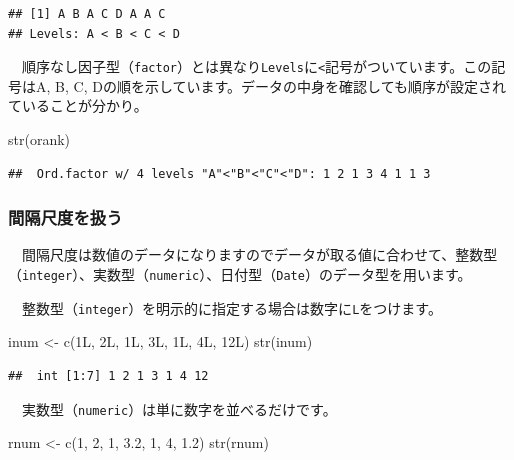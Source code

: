 \documentclass[
  12pt,
]{book}
\newenvironment{Shaded}{\begin{snugshade}}{\end{snugshade}}
\newcommand{\DecValTok}[1]{\textcolor[rgb]{0.00,0.00,0.81}{#1}}
\newcommand{\FloatTok}[1]{\textcolor[rgb]{0.00,0.00,0.81}{#1}}
\newcommand{\FunctionTok}[1]{\textcolor[rgb]{0.00,0.00,0.00}{#1}}
\newcommand{\NormalTok}[1]{#1}
\newcommand{\OtherTok}[1]{\textcolor[rgb]{0.56,0.35,0.01}{#1}}
\begin{document}
\begin{verbatim}
## [1] A B A C D A A C
## Levels: A < B < C < D
\end{verbatim}

　順序なし因子型（\texttt{factor}）とは異なり\texttt{Levels}に\texttt{\textless{}}記号がついています。この記号はA, B, C, Dの順を示しています。データの中身を確認しても順序が設定されていることが分かり。

\begin{Shaded}
\begin{Highlighting}[numbers=left,,]
\FunctionTok{str}\NormalTok{(orank)}
\end{Highlighting}
\end{Shaded}

\begin{verbatim}
##  Ord.factor w/ 4 levels "A"<"B"<"C"<"D": 1 2 1 3 4 1 1 3
\end{verbatim}

\hypertarget{ux9593ux9694ux5c3aux5ea6ux3092ux6271ux3046}{%
\subsubsection*{間隔尺度を扱う}\label{ux9593ux9694ux5c3aux5ea6ux3092ux6271ux3046}}

　間隔尺度は数値のデータになりますのでデータが取る値に合わせて、整数型（\texttt{integer}）、実数型（\texttt{numeric}）、日付型（\texttt{Date}）のデータ型を用います。

　整数型（\texttt{integer}）を明示的に指定する場合は数字に\texttt{L}をつけます。

\begin{Shaded}
\begin{Highlighting}[numbers=left,,]
\NormalTok{inum }\OtherTok{\textless{}{-}} \FunctionTok{c}\NormalTok{(1L, 2L, 1L, 3L, 1L, 4L, 12L)}
\FunctionTok{str}\NormalTok{(inum)}
\end{Highlighting}
\end{Shaded}

\begin{verbatim}
##  int [1:7] 1 2 1 3 1 4 12
\end{verbatim}

　実数型（\texttt{numeric}）は単に数字を並べるだけです。

\begin{Shaded}
\begin{Highlighting}[numbers=left,,]
\NormalTok{rnum }\OtherTok{\textless{}{-}} \FunctionTok{c}\NormalTok{(}\DecValTok{1}\NormalTok{, }\DecValTok{2}\NormalTok{, }\DecValTok{1}\NormalTok{, }\FloatTok{3.2}\NormalTok{, }\DecValTok{1}\NormalTok{, }\DecValTok{4}\NormalTok{, }\FloatTok{1.2}\NormalTok{)}
\FunctionTok{str}\NormalTok{(rnum)}
\end{Highlighting}
\end{Shaded}
\end{document}
